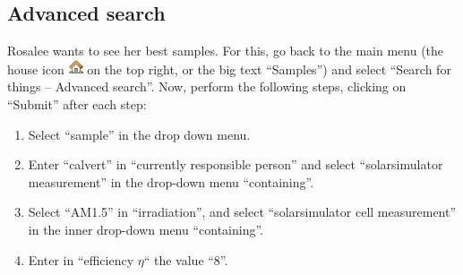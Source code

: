 \documentclass[a4paper,11pt,english]{sphinxmanual}
\begin{document}
\subsection{Advanced search}
\label{demo:advanced-search}\label{demo:index-10}
{\hfill{}}

Rosalee wants to see her best samples.  For this, go back to the main menu (the
house icon \includegraphics{house.png} on the top right, or the big text “Samples”) and select
“Search for things – Advanced search”.  Now, perform the following steps,
clicking on “Submit” after each step:
\begin{enumerate}
\item {} 
Select “sample” in the drop down menu.

\item {} 
Enter “calvert” in “currently responsible person” and select “solarsimulator
measurement” in the drop-down menu “containing”.

\item {} 
Select “AM1.5” in “irradiation”, and select “solarsimulator cell
measurement” in the inner drop-down menu “containing”.

\item {} 
Enter in “efficiency \(\eta\)“ the value “8”.

\end{enumerate}
\end{document}
